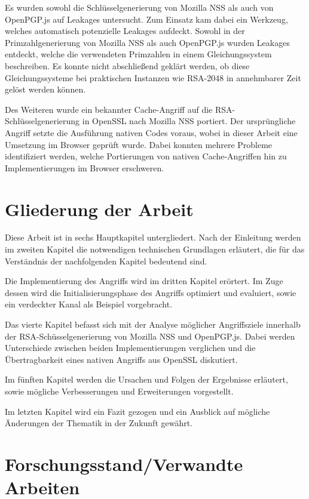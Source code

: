 \par\medskip

Es wurden sowohl die Schlüsselgenerierung von Mozilla NSS als auch von OpenPGP.js auf Leakages untersucht. 
Zum Einsatz kam dabei ein Werkzeug, welches automatisch potenzielle Leakages aufdeckt.
Sowohl in der Primzahlgenerierung von Mozilla NSS als auch OpenPGP.js wurden Leakages entdeckt, welche die verwendeten Primzahlen in einem Gleichungssystem beschreiben.
Es konnte nicht abschließend geklärt werden, ob diese Gleichungssysteme bei praktischen Instanzen wie RSA-2048 in annehmbarer Zeit gelöst werden können.

Des Weiteren wurde ein bekannter Cache-Angriff auf die RSA-Schlüsselgenerierung in OpenSSL nach Mozilla NSS portiert.
Der ursprüngliche Angriff setzte die Ausführung nativen Codes voraus, wobei in dieser Arbeit eine Umsetzung im Browser geprüft wurde.
Dabei konnten mehrere Probleme identifiziert werden, welche Portierungen von nativen Cache-Angriffen hin zu Implementierungen im Browser erschweren.

\section{Gliederung der Arbeit}

Diese Arbeit ist in sechs Hauptkapitel untergliedert. 
Nach der Einleitung werden im zweiten Kapitel die notwendigen technischen Grundlagen erläutert, die für das Verständnis der nachfolgenden Kapitel bedeutend sind.

Die Implementierung des Angriffs wird im dritten Kapitel erörtert. 
Im Zuge dessen wird die Initialisierungsphase des Angriffs optimiert und evaluiert, sowie ein verdeckter Kanal als Beispiel vorgebracht.

Das vierte Kapitel befasst sich mit der Analyse möglicher Angriffsziele innerhalb der RSA-Schüsselgenerierung von Mozilla NSS und OpenPGP.js.
Dabei werden Unterschiede zwischen beiden Implementierungen verglichen und die Übertragbarkeit eines nativen Angriffs aus OpenSSL diskutiert.

Im fünften Kapitel werden die Ursachen und Folgen der Ergebnisse erläutert, sowie mögliche Verbesserungen und Erweiterungen vorgestellt.

Im letzten Kapitel wird ein Fazit gezogen und ein Ausblick auf mögliche Änderungen der Thematik in der Zukunft gewährt.

\section{Forschungsstand/Verwandte Arbeiten}

